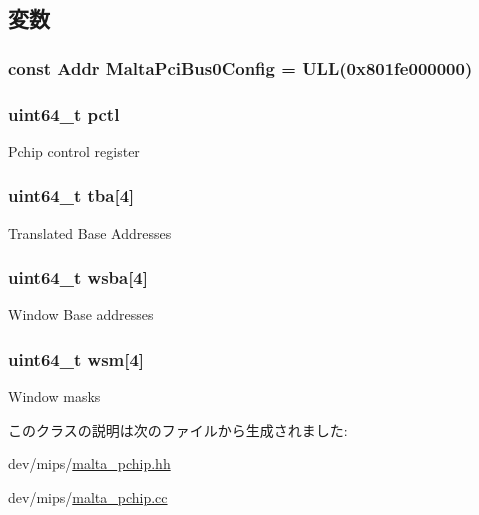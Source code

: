 \subsection{変数}
\hypertarget{classMaltaPChip_a3b0c17d07ca94915a8f0a53df21f2607}{
\subsubsection[{MaltaPciBus0Config}]{\setlength{\rightskip}{0pt plus 5cm}const {\bf Addr} {\bf MaltaPciBus0Config} = ULL(0x801fe000000)}}
\label{classMaltaPChip_a3b0c17d07ca94915a8f0a53df21f2607}
\hypertarget{classMaltaPChip_a8df2c098b72e9eee77a79290c8e4a6c5}{
\subsubsection[{pctl}]{\setlength{\rightskip}{0pt plus 5cm}uint64\_\-t {\bf pctl}}}
\label{classMaltaPChip_a8df2c098b72e9eee77a79290c8e4a6c5}
Pchip control register \hypertarget{classMaltaPChip_ad35698b8e7094fe0888d00cad38965ec}{
\subsubsection[{tba}]{\setlength{\rightskip}{0pt plus 5cm}uint64\_\-t {\bf tba}\mbox{[}4\mbox{]}}}
\label{classMaltaPChip_ad35698b8e7094fe0888d00cad38965ec}
Translated Base Addresses \hypertarget{classMaltaPChip_a8281ba8e4694bf75ec8b8b5d4d4ad50f}{
\subsubsection[{wsba}]{\setlength{\rightskip}{0pt plus 5cm}uint64\_\-t {\bf wsba}\mbox{[}4\mbox{]}}}
\label{classMaltaPChip_a8281ba8e4694bf75ec8b8b5d4d4ad50f}
Window Base addresses \hypertarget{classMaltaPChip_a16d1e04d18db960e6c8059d404989395}{
\subsubsection[{wsm}]{\setlength{\rightskip}{0pt plus 5cm}uint64\_\-t {\bf wsm}\mbox{[}4\mbox{]}}}
\label{classMaltaPChip_a16d1e04d18db960e6c8059d404989395}
Window masks 

このクラスの説明は次のファイルから生成されました:\begin{DoxyCompactItemize}
\item 
dev/mips/\hyperlink{malta__pchip_8hh}{malta\_\-pchip.hh}\item 
dev/mips/\hyperlink{malta__pchip_8cc}{malta\_\-pchip.cc}\end{DoxyCompactItemize}
